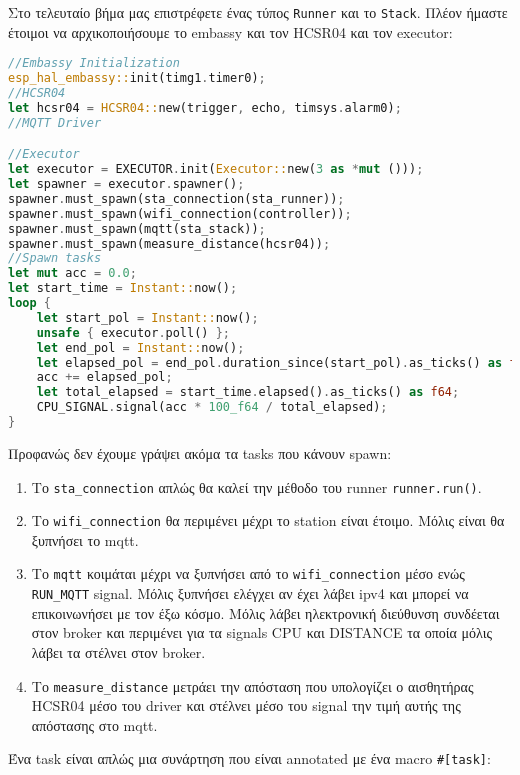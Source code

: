 Στο τελευταίο βήμα μας επιστρέφετε ένας τύπος \verb|Runner| και το \verb|Stack|. Πλέον ήμαστε έτοιμοι
να αρχικοποιήσουμε το embassy και τον HCSR04 και τον executor:

\begin{lstlisting}[language=Rust]
//Embassy Initialization
esp_hal_embassy::init(timg1.timer0);
//HCSR04
let hcsr04 = HCSR04::new(trigger, echo, timsys.alarm0);
//MQTT Driver

//Executor
let executor = EXECUTOR.init(Executor::new(3 as *mut ()));
let spawner = executor.spawner();
spawner.must_spawn(sta_connection(sta_runner));
spawner.must_spawn(wifi_connection(controller));
spawner.must_spawn(mqtt(sta_stack));
spawner.must_spawn(measure_distance(hcsr04));
//Spawn tasks
let mut acc = 0.0;
let start_time = Instant::now();
loop {
    let start_pol = Instant::now();
    unsafe { executor.poll() };
    let end_pol = Instant::now();
    let elapsed_pol = end_pol.duration_since(start_pol).as_ticks() as f64;
    acc += elapsed_pol;
    let total_elapsed = start_time.elapsed().as_ticks() as f64;
    CPU_SIGNAL.signal(acc * 100_f64 / total_elapsed);
}
\end{lstlisting}

Προφανώς δεν έχουμε γράψει ακόμα τα tasks που κάνουν spawn:

\begin{enumerate}
  \item Το \verb|sta_connection| απλώς θα καλεί την μέθοδο του runner \verb|runner.run()|.
  \item Το \verb|wifi_connection| θα περιμένει μέχρι το station είναι έτοιμο. Μόλις είναι θα ξυπνήσει το mqtt.
  \item Το \verb|mqtt| κοιμάται μέχρι να ξυπνήσει από το \verb|wifi_connection| μέσο ενώς \verb|RUN_MQTT| signal.
    Μόλις ξυπνήσει ελέγχει αν έχει λάβει ipv4 και μπορεί να επικοινωνήσει με τον έξω κόσμο.
    Μόλις λάβει ηλεκτρονική διεύθυνση συνδέεται στον broker και περιμένει για τα signals CPU και DISTANCE τα οποία μόλις
    λάβει τα στέλνει στον broker.
  \item Το \verb|measure_distance| μετράει την απόσταση που υπολογίζει ο αισθητήρας HCSR04 μέσο του driver και στέλνει μέσο
    του signal την τιμή αυτής της απόστασης στο mqtt.    
\end{enumerate}

Ένα task είναι απλώς μια συνάρτηση που είναι annotated με ένα macro \verb|#[task]|:

